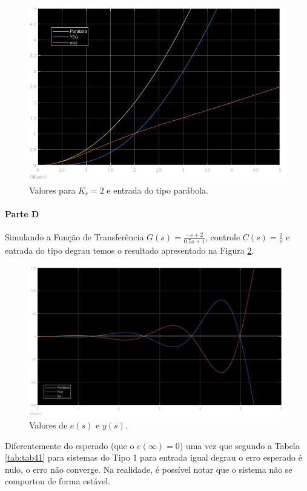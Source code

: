 \documentclass[
]{book}
\theoremstyle{definition}
\theoremstyle{definition}
\theoremstyle{definition}
\theoremstyle{remark}
\begin{document}
\begin{figure}
\includegraphics[width=0.8\linewidth]{Imagens/Lab4/Resolução/prob2C1} \caption{Valores para $K_c = 2$ e entrada do tipo parábola.}\label{fig:fig42C1}
\end{figure}

\hypertarget{parte-d}{%
\paragraph{Parte D}\label{parte-d}}

Simulando a Função de Transferência \(G(s) = \frac {-s+2}{0.5s +1}\), controle \(C(s) = \frac {2}{s}\) e entrada do tipo degrau temos o resultado apresentado na Figura \ref{fig:fig42D1}.

\begin{figure}
\includegraphics[width=0.8\linewidth]{Imagens/Lab4/Resolução/prob2D1} \caption{Valores de $e(s)$ e $y(s)$.}\label{fig:fig42D1}
\end{figure}

Diferentemente do esperado (que o \(e(\infty) = 0\)) uma vez que segundo a Tabela \ref{tab:tab41} para sistemas do Tipo 1 para entrada igual degrau o erro esperado é nulo, o erro não converge. Na realidade, é possível notar que o sistema não se comportou de forma estável.
\end{document}
